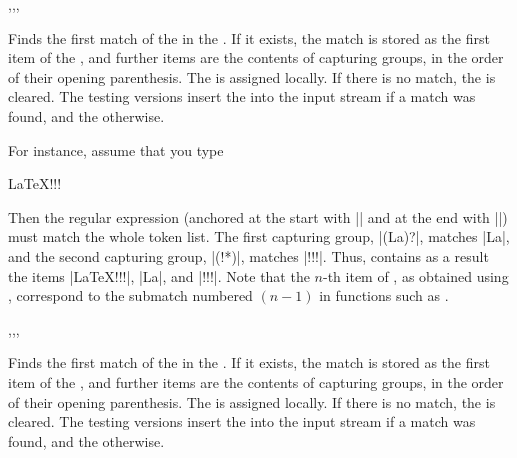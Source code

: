 \documentclass[oneside]{book}
\begin{document}
\begin{function}{\regexExtractOnce,\regexExtractOnceT,\regexExtractOnceF,\regexExtractOnceTF}
\begin{syntax}
   
    
    
     
\end{syntax}
Finds the first match of the  in the
. If it exists, the match is stored as the first
item of the , and further items are the contents of
capturing groups, in the order of their opening parenthesis. The
 is assigned locally. If there is no match, the
 is cleared.  The testing versions insert the
 into the input stream if a match was found, and the
 otherwise.
\par
For instance, assume that you type
\begin{codehigh}
 {LaTeX!!!} \lTmpaSeq
\end{codehigh}
Then the regular expression (anchored at the start with |\A| and
at the end with |\Z|) must match the whole token list. The first
capturing group, |(La)?|, matches |La|, and the second capturing
group, |(!*)|, matches |!!!|. Thus,  contains as a result
the items |{LaTeX!!!}|, |{La}|, and |{!!!}|.
Note that the $n$-th item of , as obtained using
, correspond to the submatch numbered $(n-1)$ in
functions such as .
\end{function}

\begin{function}{\regexVarExtractOnce,\regexVarExtractOnceT,\regexVarExtractOnceF,\regexVarExtractOnceTF}
\begin{syntax}
   
    
    
     
\end{syntax}
Finds the first match of the  in the
. If it exists, the match is stored as the first
item of the , and further items are the contents of
capturing groups, in the order of their opening parenthesis. The
 is assigned locally. If there is no match, the
 is cleared.  The testing versions insert the
 into the input stream if a match was found, and the
 otherwise.
\end{function}
\end{document}
